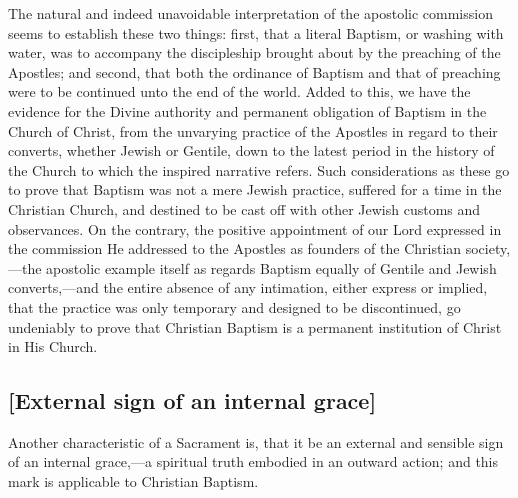 \documentclass[
  english,
]{book}
\begin{document}
The natural and indeed unavoidable interpretation of the apostolic commission seems to establish these two things: first, that a literal Baptism, or washing with water, was to accompany the discipleship brought about by the preaching of the Apostles; and second, that both the ordinance of Baptism and that of preaching were to be continued unto the end of the world. Added to this, we have the evidence for the Divine authority and permanent obligation of Baptism in the Church of Christ, from the unvarying practice of the Apostles in regard to their converts, whether Jewish or Gentile, down to the latest period in the history of the Church to which the inspired narrative refers. Such considerations as these go to prove that Baptism was not a mere Jewish practice, suffered for a time in the Christian Church, and destined to be cast off with other Jewish customs and observances. On the contrary, the positive appointment of our Lord expressed in the commission He addressed to the Apostles as founders of the Christian society,---the apostolic example itself as regards Baptism equally of Gentile and Jewish converts,---and the entire absence of any intimation, either express or implied, that the practice was only temporary and designed to be discontinued, go undeniably to prove that Christian Baptism is a permanent institution of Christ in His Church.

\hypertarget{external-sign-of-an-internal-grace}{%
\subsection{{[}External sign of an internal grace{]}}\label{external-sign-of-an-internal-grace}}

Another characteristic of a Sacrament is, that it be an external and sensible sign of an internal grace,---a spiritual truth embodied in an outward action; and this mark is applicable to Christian Baptism.
\end{document}
